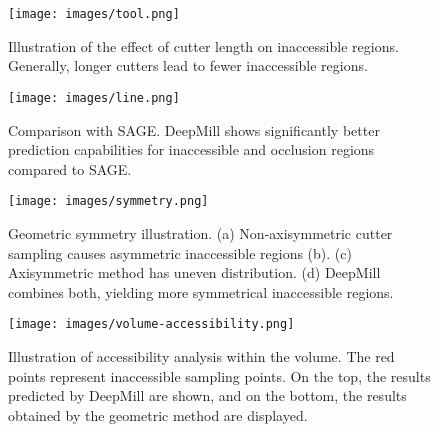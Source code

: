 \begin{figure}[htbp]
\vspace{-5pt}
\centering
  \texttt{[image: images/tool.png]}
\vspace{-20pt}
\caption{Illustration of the effect of cutter length on inaccessible regions. Generally, longer cutters lead to fewer inaccessible regions.}
\label{fig:different-cutter}    
\end{figure}


\begin{figure}[htbp]
\vspace{-5pt}
\centering
  \texttt{[image: images/line.png]}
\vspace{-20pt}
\caption{Comparison with SAGE. DeepMill shows significantly better prediction capabilities for inaccessible and occlusion regions compared to SAGE.}
\label{fig:Ablation-study}    
\end{figure}


\begin{figure}[htbp]
\vspace{-5pt}
\centering
  \texttt{[image: images/symmetry.png]}
\vspace{-15pt}
\caption{Geometric symmetry illustration. (a) Non-axisymmetric cutter sampling causes asymmetric inaccessible regions (b). (c) Axisymmetric method has uneven distribution. (d) DeepMill combines both, yielding more symmetrical inaccessible regions.}
\label{fig:symmetry}    
\end{figure}


\begin{figure}[htbp]
\centering
  \texttt{[image: images/volume-accessibility.png]}
\vspace{-7pt}
\caption{Illustration of accessibility analysis within the volume. The red points represent inaccessible sampling points. On the top, the results predicted by DeepMill are shown, and on the bottom, the results obtained by the geometric method are displayed.}
\label{fig:volume-accessibility}    
\end{figure}





\clearpage







